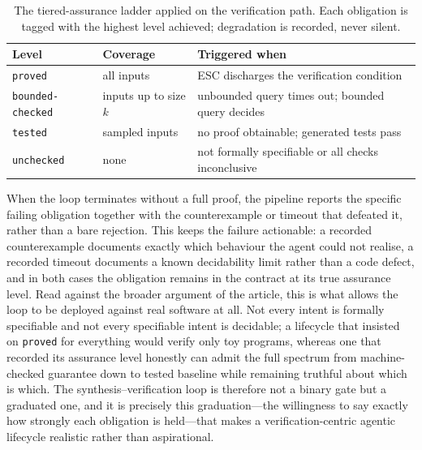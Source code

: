 \begin{table}[t]
\centering
\caption{The tiered-assurance ladder applied on the verification path. Each obligation is tagged with the highest level achieved; degradation is recorded, never silent.}
\label{tab:tiers}
\begin{tabular}{@{}lll@{}}
\toprule
Level & Coverage & Triggered when \\
\midrule
\texttt{proved} & all inputs & ESC discharges the verification condition \\
\texttt{bounded-checked} & inputs up to size $k$ & unbounded query times out; bounded query decides \\
\texttt{tested} & sampled inputs & no proof obtainable; generated tests pass \\
\texttt{unchecked} & none & not formally specifiable or all checks inconclusive \\
\bottomrule
\end{tabular}
\end{table}

When the loop terminates without a full proof, the pipeline reports the specific failing obligation together with the counterexample or timeout that defeated it, rather than a bare rejection. This keeps the failure actionable: a recorded counterexample documents exactly which behaviour the agent could not realise, a recorded timeout documents a known decidability limit rather than a code defect, and in both cases the obligation remains in the contract at its true assurance level. Read against the broader argument of the article, this is what allows the loop to be deployed against real software at all. Not every intent is formally specifiable and not every specifiable intent is decidable; a lifecycle that insisted on \texttt{proved} for everything would verify only toy programs, whereas one that recorded its assurance level honestly can admit the full spectrum from machine-checked guarantee down to tested baseline while remaining truthful about which is which. The synthesis--verification loop is therefore not a binary gate but a graduated one, and it is precisely this graduation---the willingness to say exactly how strongly each obligation is held---that makes a verification-centric agentic lifecycle realistic rather than aspirational.
